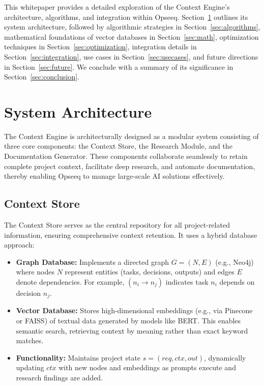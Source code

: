 \documentclass[11pt]{article}
\begin{document}
This whitepaper provides a detailed exploration of the Context Engine’s architecture, algorithms, and integration within Opseeq. Section~\ref{sec:architecture} outlines its system architecture, followed by algorithmic strategies in Section~\ref{sec:algorithms}, mathematical foundations of vector databases in Section~\ref{sec:math}, optimization techniques in Section~\ref{sec:optimization}, integration details in Section~\ref{sec:integration}, use cases in Section~\ref{sec:usecases}, and future directions in Section~\ref{sec:future}. We conclude with a summary of its significance in Section~\ref{sec:conclusion}.

\section{System Architecture}
\label{sec:architecture}

The Context Engine is architecturally designed as a modular system consisting of three core components: the Context Store, the Research Module, and the Documentation Generator. These components collaborate seamlessly to retain complete project context, facilitate deep research, and automate documentation, thereby enabling Opseeq to manage large-scale AI solutions effectively.

\subsection{Context Store}
\label{subsec:context_store}

The Context Store serves as the central repository for all project-related information, ensuring comprehensive context retention. It uses a hybrid database approach:

\begin{itemize}
  \item \textbf{Graph Database:} Implements a directed graph \(G = (N, E)\) (e.g., Neo4j) where nodes \(N\) represent entities (tasks, decisions, outputs) and edges \(E\) denote dependencies. For example, \( (n_i \rightarrow n_j) \) indicates task \(n_i\) depends on decision \(n_j\).
  \item \textbf{Vector Database:} Stores high-dimensional embeddings (e.g., via Pinecone or FAISS) of textual data generated by models like BERT. This enables semantic search, retrieving context by meaning rather than exact keyword matches.
  \item \textbf{Functionality:} Maintains project state \( s = (req, ctx, out) \), dynamically updating \(ctx\) with new nodes and embeddings as prompts execute and research findings are added.
\end{itemize}
\end{document}
